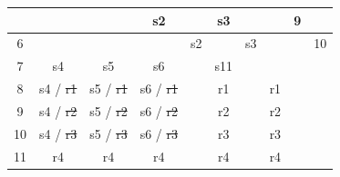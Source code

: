 \begin{table}[!h]
{\begin{tabular}{|cccccccccc|}
			\multicolumn{1}{c|}{} &
			\multicolumn{1}{c|}{} &
			\multicolumn{1}{c|}{} &
			\multicolumn{1}{c|}{s2} &
			\multicolumn{1}{c|}{} &
			\multicolumn{1}{c|}{s3} &
			\multicolumn{1}{c|}{} &
			\multicolumn{1}{c|}{} &
			9 \\ \hline
			\multicolumn{1}{|c|}{6} &
			\multicolumn{1}{c|}{} &
			\multicolumn{1}{c|}{} &
			\multicolumn{1}{c|}{} &
			\multicolumn{1}{c|}{s2} &
			\multicolumn{1}{c|}{} &
			\multicolumn{1}{c|}{s3} &
			\multicolumn{1}{c|}{} &
			\multicolumn{1}{c|}{} &
			10 \\ \hline
			\multicolumn{1}{|c|}{7} &
			\multicolumn{1}{c|}{s4} &
			\multicolumn{1}{c|}{s5} &
			\multicolumn{1}{c|}{s6} &
			\multicolumn{1}{c|}{} &
			\multicolumn{1}{c|}{s11} &
			\multicolumn{1}{c|}{} &
			\multicolumn{1}{c|}{} &
			\multicolumn{1}{c|}{} &
			\\ \hline
			\multicolumn{1}{|c|}{8} &
			\multicolumn{1}{c|}{\cellcolor[HTML]{FFC0CB}s4 / \sout{r1}} &
			\multicolumn{1}{c|}{\cellcolor[HTML]{FFC0CB}s5 / \sout{r1}} &
			\multicolumn{1}{c|}{\cellcolor[HTML]{FFC0CB}s6 / \sout{r1}} &
			\multicolumn{1}{c|}{} &
			\multicolumn{1}{c|}{r1} &
			\multicolumn{1}{c|}{} &
			\multicolumn{1}{c|}{r1} &
			\multicolumn{1}{c|}{} &
			\\ \hline
			\multicolumn{1}{|c|}{9} &
			\multicolumn{1}{c|}{\cellcolor[HTML]{FFC0CB}s4 / \sout{r2}} &
			\multicolumn{1}{c|}{\cellcolor[HTML]{FFC0CB}s5 / \sout{r2}} &
			\multicolumn{1}{c|}{\cellcolor[HTML]{FFC0CB}s6 / \sout{r2}} &
			\multicolumn{1}{c|}{} &
			\multicolumn{1}{c|}{r2} &
			\multicolumn{1}{c|}{} &
			\multicolumn{1}{c|}{r2} &
			\multicolumn{1}{c|}{} &
			\\ \hline
			\multicolumn{1}{|c|}{10} &
			\multicolumn{1}{c|}{\cellcolor[HTML]{FFC0CB}s4 / \sout{r3}} &
			\multicolumn{1}{c|}{\cellcolor[HTML]{FFC0CB}s5 / \sout{r3}} &
			\multicolumn{1}{c|}{\cellcolor[HTML]{FFC0CB}s6 / \sout{r3}} &
			\multicolumn{1}{c|}{} &
			\multicolumn{1}{c|}{r3} &
			\multicolumn{1}{c|}{} &
			\multicolumn{1}{c|}{r3} &
			\multicolumn{1}{c|}{} &
			\\ \hline
			\multicolumn{1}{|c|}{11} &
			\multicolumn{1}{c|}{r4} &
			\multicolumn{1}{c|}{r4} &
			\multicolumn{1}{c|}{r4} &
			\multicolumn{1}{c|}{} &
			\multicolumn{1}{c|}{r4} &
			\multicolumn{1}{c|}{} &
			\multicolumn{1}{c|}{r4} &
			\multicolumn{1}{c|}{} &
			\\ \hline
		\end{tabular}%
	}
\end{table}


